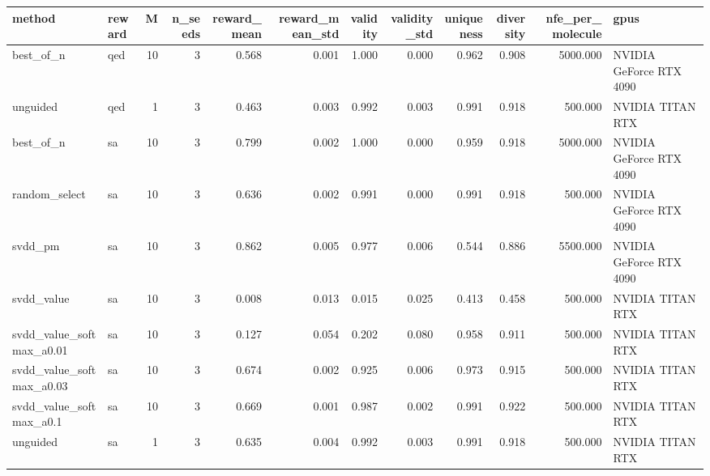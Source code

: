 \begin{tabular}{llrrrrrrrrrl}
\toprule
method & reward & M & n_seeds & reward_mean & reward_mean_std & validity & validity_std & uniqueness & diversity & nfe_per_molecule & gpus \\
\midrule
best_of_n & qed & 10 & 3 & 0.568 & 0.001 & 1.000 & 0.000 & 0.962 & 0.908 & 5000.000 & NVIDIA GeForce RTX 4090 \\
unguided & qed & 1 & 3 & 0.463 & 0.003 & 0.992 & 0.003 & 0.991 & 0.918 & 500.000 & NVIDIA TITAN RTX \\
best_of_n & sa & 10 & 3 & 0.799 & 0.002 & 1.000 & 0.000 & 0.959 & 0.918 & 5000.000 & NVIDIA GeForce RTX 4090 \\
random_select & sa & 10 & 3 & 0.636 & 0.002 & 0.991 & 0.000 & 0.991 & 0.918 & 500.000 & NVIDIA GeForce RTX 4090 \\
svdd_pm & sa & 10 & 3 & 0.862 & 0.005 & 0.977 & 0.006 & 0.544 & 0.886 & 5500.000 & NVIDIA GeForce RTX 4090 \\
svdd_value & sa & 10 & 3 & 0.008 & 0.013 & 0.015 & 0.025 & 0.413 & 0.458 & 500.000 & NVIDIA TITAN RTX \\
svdd_value_softmax_a0.01 & sa & 10 & 3 & 0.127 & 0.054 & 0.202 & 0.080 & 0.958 & 0.911 & 500.000 & NVIDIA TITAN RTX \\
svdd_value_softmax_a0.03 & sa & 10 & 3 & 0.674 & 0.002 & 0.925 & 0.006 & 0.973 & 0.915 & 500.000 & NVIDIA TITAN RTX \\
svdd_value_softmax_a0.1 & sa & 10 & 3 & 0.669 & 0.001 & 0.987 & 0.002 & 0.991 & 0.922 & 500.000 & NVIDIA TITAN RTX \\
unguided & sa & 1 & 3 & 0.635 & 0.004 & 0.992 & 0.003 & 0.991 & 0.918 & 500.000 & NVIDIA TITAN RTX \\
\bottomrule
\end{tabular}
